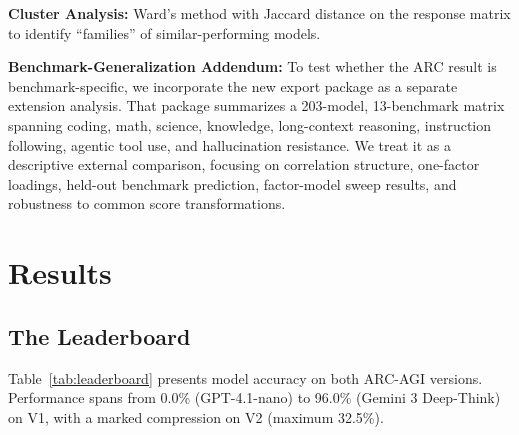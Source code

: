 \documentclass[11pt, letterpaper]{article}
\begin{document}
\textbf{Cluster Analysis:} Ward's method with Jaccard distance on the response matrix to identify ``families'' of similar-performing models.

\textbf{Benchmark-Generalization Addendum:} To test whether the ARC result is benchmark-specific, we incorporate the new export package as a separate extension analysis. That package summarizes a 203-model, 13-benchmark matrix spanning coding, math, science, knowledge, long-context reasoning, instruction following, agentic tool use, and hallucination resistance. We treat it as a descriptive external comparison, focusing on correlation structure, one-factor loadings, held-out benchmark prediction, factor-model sweep results, and robustness to common score transformations.

\section{Results}
\label{sec:results}

\subsection{The Leaderboard}
\label{sec:leaderboard}

Table~\ref{tab:leaderboard} presents model accuracy on both ARC-AGI versions. Performance spans from 0.0\% (GPT-4.1-nano) to 96.0\% (Gemini 3 Deep-Think) on V1, with a marked compression on V2 (maximum 32.5\%).
\end{document}

